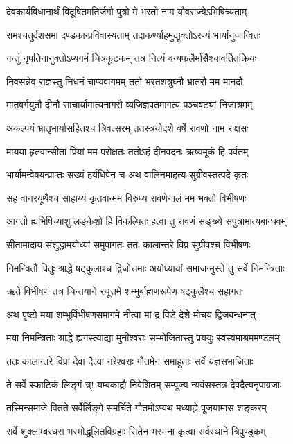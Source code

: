 \twolineshloka
{देवकार्यविधानार्थं विदूषितमतिर्जगौ}
{पुत्रो मे भरतो नाम यौवराज्येऽभिषिच्यताम्}%

\twolineshloka
{रामश्चतुर्दशसमा दण्डकान्प्रविवास्यताम्}
{तदाकर्ण्याहमुद्युक्तोऽरण्यं भार्यानुजान्वितः}%

\twolineshloka
{गन्तुं नृपतिनानुक्तोऽप्यगमं चित्रकूटकम्}
{तत्र नित्यं वन्यफलैर्मांसैश्चावर्तितक्रियः}%

\twolineshloka
{निवसन्नेव राज्ञस्तु निधनं चाप्यवागमम्}
{ततो भरतशत्रुघ्नौ भ्रातरौ मम मानदौ}%

\twolineshloka
{मातृवर्गयुतौ दीनौ साचार्यामात्यनागरौ}
{व्यजिज्ञपतमागत्य पञ्चवट्यां निजाश्रमम्}%

\twolineshloka
{अकल्पयं भ्रातृभार्यासहितश्च त्रिवत्सरम्}
{ततस्त्रयोदशे वर्षे रावणो नाम राक्षसः}%

\twolineshloka
{मायया हृतवान्सीतां प्रियां मम परोक्षतः}
{ततोऽहं दीनवदनः ऋष्यमूकं हि पर्वतम्}%

\twolineshloka
{भार्यामन्वेषयन्प्राप्तः सख्यं हर्यधिपेन च}
{अथ वालिनमाहत्य सुग्रीवस्तत्पदे कृतः}%

\twolineshloka
{सह वानरयूथैश्च साहाय्यं कृतवान्मम}
{विरुध्य रावणेनालं मम भक्तो विभीषणः}%

\twolineshloka
{आगतो ह्यभिषिच्याशु लङ्केशो हि विकल्पितः}
{हत्वा तु रावणं सङ्ख्ये सपुत्रामात्यबान्धवम्}%

\twolineshloka
{सीतामादाय संशुद्धामयोध्यां समुपागतः}
{ततः कालान्तरे विप्र सुग्रीवश्च विभीषणः}%

\twolineshloka
{निमन्त्रितौ पितुः श्राद्धे षट्कुलाश्च द्विजोत्तमाः}
{अयोध्यायां समाजग्मुस्ते तु सर्वे निमन्त्रिताः}%

\twolineshloka
{ऋते विभीषणं तत्र चिन्तयाने रघूत्तमे}
{शम्भुर्बाह्मणरूपेण षट्कुलैश्च सहागतः}%

\twolineshloka
{अथ पृष्टो मया शम्भुर्विभीषणसमागमे}
{नीत्वा मां द्र विडे देशे मोचय द्विजबन्धनात्}%

\twolineshloka
{मया निमन्त्रिताः श्राद्धे ह्यगस्त्याद्या मुनीश्वराः}
{सम्भोजितास्तु प्रययुः स्वस्वमाश्रममण्डलम्}%

\twolineshloka
{ततः कालान्तरे विप्रा देवा दैत्या नरेश्वराः}
{गौतमेन समाहूताः सर्वे यज्ञसभाजिताः}%

\twolineshloka
{ते सर्वे स्फाटिकं लिङ्गं त्र्! यम्बकाद्रौ निवेशितम्}
{सम्पूज्य न्यवंसस्तत्र देवदैत्यनृपाग्रजाः}%

\twolineshloka
{तस्मिन्समाजे वितते सर्वैर्लिङ्गे समर्चिते}
{गौतमोऽप्यथ मध्याह्ने पूजयामास शङ्करम्}%

\twolineshloka
{सर्वे शुक्लाम्बरधरा भस्मोद्धूलितविग्रहाः}
{सितेन भस्मना कृत्वा सर्वस्थाने त्रिपुण्ड्रकम्}%

